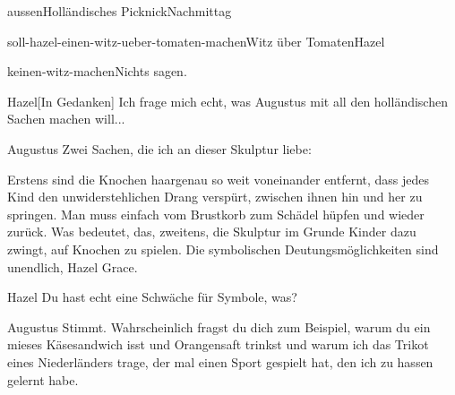 \documentclass[12pt]{article}
\begin{document}
\begin{scene}{aussen}{Holländisches Picknick}{Nachmittag}
\begin{decision}{soll-hazel-einen-witz-ueber-tomaten-machen}{Witz über Tomaten}{Hazel}
            \begin{option}{keinen-witz-machen}{Nichts sagen.}
            \end{option}
        \end{decision}


        \begin{dialog}{Hazel}[In Gedanken]
            Ich frage mich echt, was Augustus mit all den holländischen Sachen machen will...
        \end{dialog}


        \begin{dialog}{Augustus}
            Zwei Sachen, die ich an dieser Skulptur liebe:


            Erstens sind die Knochen haargenau so weit voneinander entfernt, dass jedes Kind den unwiderstehlichen Drang verspürt, zwischen ihnen hin und her zu springen.
            Man muss einfach vom Brustkorb zum Schädel hüpfen und wieder zurück.
            Was bedeutet, das, zweitens, die Skulptur im Grunde Kinder dazu zwingt, auf Knochen zu spielen.
            Die symbolischen Deutungsmöglichkeiten sind unendlich, Hazel Grace.
        \end{dialog}

        \begin{dialog}{Hazel}
            Du hast echt eine Schwäche für Symbole, was?
        \end{dialog}

        \begin{dialog}{Augustus}
            Stimmt.
            Wahrscheinlich fragst du dich zum Beispiel, warum du ein mieses Käsesandwich isst und Orangensaft trinkst und warum ich das Trikot eines Niederländers trage, der mal einen Sport gespielt hat, den ich zu hassen gelernt habe.
        \end{dialog}


\end{scene}
\end{document}
